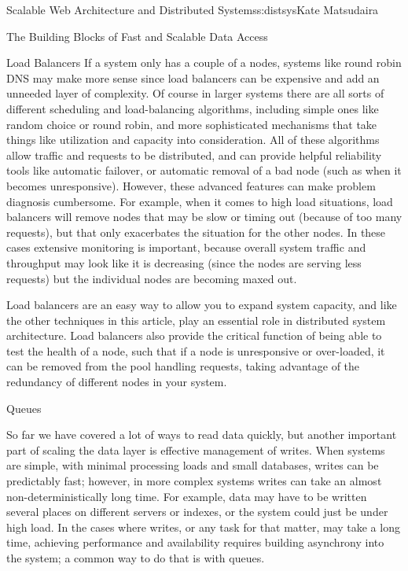 \begin{aosachapter}{Scalable Web Architecture and Distributed Systems}{s:distsys}{Kate Matsudaira}
\begin{aosasect1}{The Building Blocks of Fast and Scalable Data Access}
\begin{aosasect2}{Load Balancers}
If a system only has a couple of a nodes, systems like round robin DNS
may make more sense since load balancers can be expensive and add an
unneeded layer of complexity. Of course in larger systems there are
all sorts of different scheduling and load-balancing algorithms,
including simple ones like random choice or round robin, and more
sophisticated mechanisms that take things like utilization and
capacity into consideration. All of these algorithms allow traffic and
requests to be distributed, and can provide helpful reliability tools
like automatic failover, or automatic removal of a bad node (such as
when it becomes unresponsive). However, these advanced features can
make problem diagnosis cumbersome. For example, when it comes to high
load situations, load balancers will remove nodes that may be slow or
timing out (because of too many requests), but that only exacerbates
the situation for the other nodes. In these cases extensive monitoring
is important, because overall system traffic and throughput may look
like it is decreasing (since the nodes are serving less requests) but
the individual nodes are becoming maxed out.

Load balancers are an easy way to allow you to expand system capacity, and like
the other techniques in this article, play an essential role in
distributed system architecture. Load balancers also provide the
critical function of being able to test the health of a node, such
that if a node is unresponsive or over-loaded, it can be removed from
the pool handling requests, taking advantage of the redundancy of
different nodes in your system.

\end{aosasect2}

\begin{aosasect2}{Queues}

So far we have covered a lot of ways to read data quickly, but
another important part of scaling the data layer is effective
management of writes. When systems are simple, with minimal
processing loads and small databases, writes can be predictably fast;
however, in more complex systems writes can take an almost
non-deterministically long time. For example, data may have to be
written several places on different servers or indexes, or the system
could just be under high load. In the cases where writes, or any task
for that matter, may take a long time, achieving performance and
availability requires building asynchrony into the system; a
common way to do that is with queues.



\end{aosasect2}
\end{aosasect1}
\end{aosachapter}
